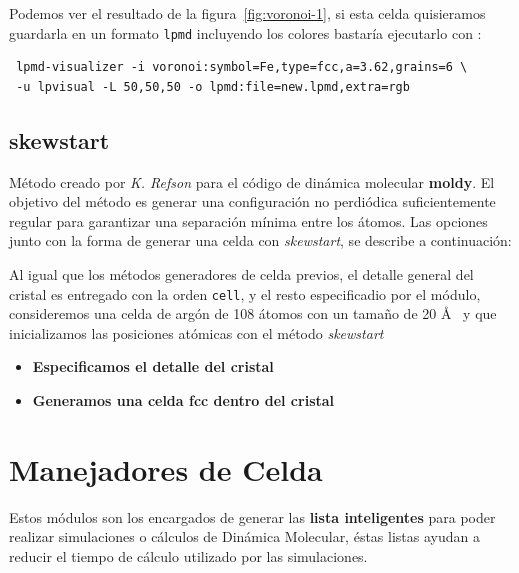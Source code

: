 Podemos ver el resultado de la figura~\ref{fig:voronoi-1}, si esta celda quisieramos guardarla en un formato \verb|lpmd| incluyendo los colores bastar\'ia ejecutarlo con :

 \begin{verbatim}
 lpmd-visualizer -i voronoi:symbol=Fe,type=fcc,a=3.62,grains=6 \
 -u lpvisual -L 50,50,50 -o lpmd:file=new.lpmd,extra=rgb
\end{verbatim}



\subsection{skewstart}
M\'etodo creado por \textit{K. Refson} para el c\'odigo de din\'amica molecular \textbf{moldy}. El objetivo del m\'etodo es generar una configuraci\'on no perdi\'odica suficientemente regular para garantizar una separaci\'on m\'inima entre los \'atomos. Las opciones junto con la forma de generar una celda con \textit{skewstart}, se describe a continuaci\'on:


Al igual que los m\'etodos generadores de celda previos, el detalle general del cristal es entregado con la orden \verb|cell|, y el resto especificadio por el m\'odulo, consideremos una celda de arg\'on de 108 \'atomos con un tama\~no de 20 \AA~ y que inicializamos las posiciones at\'omicas con el m\'etodo \textit{skewstart}

\begin{itemize}
 \item \textbf{Especificamos el detalle del cristal}
 \item \textbf{Generamos una celda  fcc dentro del cristal}
\end{itemize}
\section{Manejadores de Celda}
Estos m\'odulos son los encargados de generar las \textbf{lista inteligentes} para poder realizar simulaciones o c\'alculos de Din\'amica Molecular, \'estas listas ayudan a reducir el tiempo de c\'alculo utilizado por las simulaciones.

